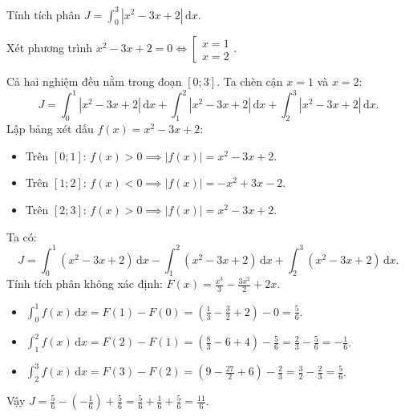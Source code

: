 \documentclass[12pt]{article}
\begin{document}
	\begin{vidu}
		Tính tích phân $J = \displaystyle \int_{0}^{3} |x^2 - 3x + 2|\,\mathrm{d}x$.
	\end{vidu}
	\begin{loigiai}
		Xét phương trình $x^2 - 3x + 2 = 0 \iff \left[ \begin{array}{l} x = 1 \\ x = 2 \end{array} \right.$.
		
		Cả hai nghiệm đều nằm trong đoạn $[0; 3]$. Ta chèn cận $x = 1$ và $x = 2$:
		\[
		J = \int_{0}^{1} |x^2 - 3x + 2|\,\mathrm{d}x + \int_{1}^{2} |x^2 - 3x + 2|\,\mathrm{d}x + \int_{2}^{3} |x^2 - 3x + 2|\,\mathrm{d}x.
		\]
		Lập bảng xét dấu $f(x) = x^2 - 3x + 2$:
		\begin{itemize}
			\item Trên $[0; 1]$: $f(x) > 0 \implies |f(x)| = x^2 - 3x + 2$.
			\item Trên $[1; 2]$: $f(x) < 0 \implies |f(x)| = -x^2 + 3x - 2$.
			\item Trên $[2; 3]$: $f(x) > 0 \implies |f(x)| = x^2 - 3x + 2$.
		\end{itemize}
		Ta có:
		\[
		J = \int_{0}^{1} (x^2 - 3x + 2)\,\mathrm{d}x - \int_{1}^{2} (x^2 - 3x + 2)\,\mathrm{d}x + \int_{2}^{3} (x^2 - 3x + 2)\,\mathrm{d}x.
		\]
		Tính tích phân không xác định: $F(x) = \displaystyle \frac{x^3}{3} - \frac{3x^2}{2} + 2x$.
		\begin{itemize}
			\item $\displaystyle \int_{0}^{1} f(x)\,\mathrm{d}x = F(1) - F(0) = \left( \frac{1}{3} - \frac{3}{2} + 2 \right) - 0 = \frac{5}{6}$.
			\item $\displaystyle \int_{1}^{2} f(x)\,\mathrm{d}x = F(2) - F(1) = \left( \frac{8}{3} - 6 + 4 \right) - \frac{5}{6} = \frac{2}{3} - \frac{5}{6} = -\frac{1}{6}$.
			\item $\displaystyle \int_{2}^{3} f(x)\,\mathrm{d}x = F(3) - F(2) = \left( 9 - \frac{27}{2} + 6 \right) - \frac{2}{3} = \frac{3}{2} - \frac{2}{3} = \frac{5}{6}$.
		\end{itemize}
		Vậy $J = \frac{5}{6} - \left(-\frac{1}{6}\right) + \frac{5}{6} = \frac{5}{6} + \frac{1}{6} + \frac{5}{6} = \frac{11}{6}$.
	\end{loigiai}
\end{document}
